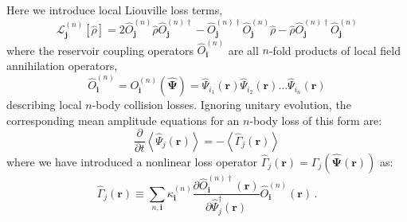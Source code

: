 \documentclass[aps,prl,twocolumn,showpacs,amsmath,amssymb,superscriptaddress]{revtex4-1}
\begin{document}
Here we introduce local Liouville loss terms,
\begin{equation}
	\mathcal{L}_{\mathbf{j}}^{(n)} \left[ \hat{\rho}\right] =
	2 \hat{O}_{\mathbf{j}}^{(n)} \hat{\rho}\hat{O}_{\mathbf{j}}^{(n)\dagger} -
	\hat{O}_{\mathbf{j}}^{(n)\dagger}\hat{O}_{\mathbf{j}}^{(n)}\hat{\rho} -
	\hat{\rho}\hat{O}_{\mathbf{j}}^{(n)\dagger}\hat{O}_{\mathbf{j}}^{(n)}
\end{equation}
where the reservoir coupling operators $\hat{O}_{\mathbf{i}}^{(n)}$
are all $n$-fold products of local field annihilation operators,
\begin{equation}
	\hat{O}_{\mathbf{i}}^{(n)} =
	O_{\mathbf{i}}^{(n)} \left( \widehat{\boldsymbol{\Psi}} \right) =
	\widehat{\Psi}_{i_{1}} \left( \mathbf{r} \right)
	\widehat{\Psi}_{i_{2}} \left( \mathbf{r} \right) \ldots
	\widehat{\Psi}_{i_{n}} \left( \mathbf{r} \right)
\end{equation}
describing local $n$-body collision losses.
Ignoring unitary evolution, the corresponding mean amplitude equations
for an $n$-body loss of this form are:
\begin{equation}
	\frac{\partial}{\partial t} \left\langle
		\widehat{\Psi}_{j} \left( \mathbf{r} \right)
	\right\rangle =
	-\left\langle \hat{\Gamma}_{j} \left( \mathbf{r} \right) \right\rangle
\end{equation}
where we have introduced a nonlinear loss operator $\hat{\Gamma}_{j} \left( \mathbf{r} \right) =
\Gamma_{j} \left( \widehat{\boldsymbol{\Psi}} \left( \mathbf{r} \right) \right)$
as:
\begin{equation}
	\hat{\Gamma}_{j} \left( \mathbf{r} \right) \equiv
	\sum_{n,\mathbf{i}} \kappa_{\mathbf{i}}^{(n)}
	\frac{\partial\hat{O}_{\mathbf{i}}^{(n)\dagger}	\left( \mathbf{r} \right)}
		{\partial \hat{\Psi}_{j}^{\dagger} \left( \mathbf{r} \right)}
	\hat{O}_{\mathbf{i}}^{(n)} \left( \mathbf{r} \right) \,.
\end{equation}
\end{document}
